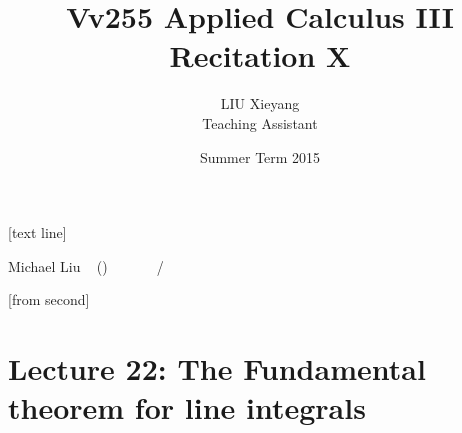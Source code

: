 \documentclass[10pt]{beamer}
\begin{document}



[text line]{%
	\color{blue!40!black}\parbox{\linewidth}{\vspace*{-8pt}Michael Liu ~ (\insertshortinstitute)\hfill\insertshorttitle\hfill\insertshortdate~~~~~~\insertframenumber{}~/~\inserttotalframenumber}}


[from second] 

\newcommand{\tabincell}[2]{\begin{tabular}{@{}#1@{}}#2\end{tabular}}


\title[Vv255 Applied Calculus III]{Vv255 Applied Calculus III\\{\small Recitation X}}   
\author[Michael Liu]{LIU Xieyang\\{\tiny Teaching Assistant}} 
\date[Summer 2015]{Summer Term 2015} 
\begin{frame}
	\titlepage
\end{frame}






\section{Lecture 22: The Fundamental theorem for line integrals} 
\end{document}
